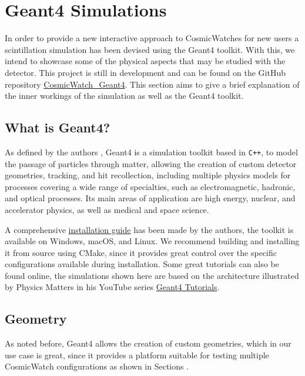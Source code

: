 \chapter{Geant4 Simulations}\label{chap:G4_simulations}

In order to provide a new interactive approach to CosmicWatches for new users a scintillation simulation has been devised using the Geant4 toolkit. With this, we intend to showcase some of the physical aspects that may be studied with the detector. This project is still in development and can be found on the GitHub repository \href{https://github.com/spenceraxani/CosmicWatch_Geant4}{CosmicWatch\_Geant4}. This section aims to give a brief explanation of the inner workings of the simulation as well as the Geant4 toolkit.

\section{What is Geant4?}

As defined by the authors \cite{Geant4}, Geant4 is a simulation toolkit based in \texttt{C++}, to model the passage of particles through matter, allowing the creation of custom detector geometries, tracking, and hit recollection, including multiple physics models for processes covering a wide range of specialties, such as electromagnetic, hadronic, and optical processes. Its main areas of application are high energy, nuclear, and accelerator physics, as well as medical and space science.

A comprehensive \href{https://geant4-userdoc.web.cern.ch/UsersGuides/InstallationGuide/html/}{installation guide} has been made by the authors, the toolkit is available on Windows, macOS, and Linux. We recommend building and installing it from source using CMake, since it provides great control over the specific configurations available during installation. Some great tutorials can also be found online, the simulations shown here are based on the architecture illustrated by Physics Matters in his YouTube series \href{https://youtube.com/playlist?list=PLLybgCU6QCGWgzNYOV0SKen9vqg4KXeVL&si=mdzOyTZS0DYsf_vc}{Geant4 Tutorials}.

\section{Geometry}

As noted before, Geant4 allows the creation of custom geometries, which in our use case is great, since it provides a platform suitable for testing multiple CosmicWatch configurations as shown in Sections .

